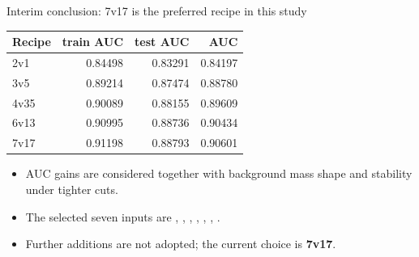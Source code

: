 \begin{frame}[label=p22_20260920]{Interim conclusion: 7v17 is the preferred recipe in this study}

\begin{center}\small\renewcommand{\arraystretch}{1.0}
\begin{tabular}{@{}lrrr@{}}\toprule
Recipe & train AUC & test AUC & AUC\\\midrule
2v1 & 0.84498 & 0.83291 & 0.84197\\
3v5 & 0.89214 & 0.87474 & 0.88780\\
4v35 & 0.90089 & 0.88155 & 0.89609\\
6v13 & 0.90995 & 0.88736 & 0.90434\\
7v17 & 0.91198 & 0.88793 & 0.90601\\
\bottomrule\end{tabular}\end{center}
\begin{itemize}\small\item AUC gains are considered together with background mass shape and stability under tighter cuts.\item The selected seven inputs are , , , , , , .\item Further additions are not adopted; the current choice is \textbf{7v17}.\end{itemize}\par\vspace{0.2em}
\end{frame}

